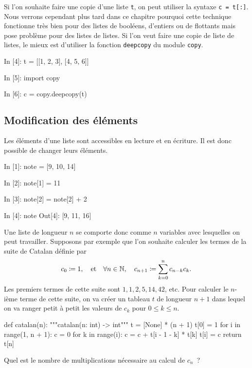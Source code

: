 \documentclass{magnoliaold}
\begin{document}
Si l'on souhaite faire une copie d'une liste \verb!t!, on peut
utiliser la syntaxe \verb!c = t[:]!. Nous verrons cependant plus tard
dans ce chapitre pourquoi cette technique fonctionne très bien pour
des listes de booléens, d'entiers ou de flottants mais pose problème
pour des listes de listes. Si l'on veut faire une copie de liste
de listes, le mieux est d'utiliser la
fonction \verb!deepcopy! du module \verb!copy!.

\begin{pythoncode}
In [4]: t = [[1, 2, 3], [4, 5, 6]]

In [5]: import copy

In [6]: c = copy.deepcopy(t)
\end{pythoncode}


\subsection{Modification des éléments}

Les éléments d'une liste sont accessibles en lecture et en écriture. Il est donc possible de changer leurs éléments.

\begin{pythoncode}
In [1]: note = [9, 10, 14]

In [2]: note[1] = 11

In [3]: note[2] = note[2] + 2

In [4]: note
Out[4]: [9, 11, 16]    
\end{pythoncode}
\noindent
Une liste de longueur $n$ se comporte donc comme $n$ variables avec lesquelles on peut
travailler. Supposons par exemple que l'on souhaite calculer les termes de la suite de Catalan
définie par
\[c_0\coloneqq 1,\quad \text{et}\quad \forall n\in\mathbb{N},\quad c_{n+1}\coloneqq\sum_{k=0}^n c_{n-k}c_k.\]
Les premiers termes de cette suite sont $1, 1, 2, 5, 14, 42$, etc. Pour calculer le $n$-ième
terme de cette suite, on va créer un tableau $t$ de longueur $n+1$ dans lequel on va ranger
petit à petit les valeurs de $c_k$ pour $0\leq k\leq n$.

\begin{pythoncode}
def catalan(n):
    """catalan(n: int) -> int"""
    t = [None] * (n + 1)
    t[0] = 1
    for i in range(1, n + 1):
        c = 0
        for k in range(i):
            c = c + t[i - 1 - k] * t[k]
        t[i] = c
    return t[n]
\end{pythoncode}

\begin{exoUnique}
\exo Quel est le nombre de multiplications nécessaire au calcul de $c_n$~?
\end{exoUnique}
\end{document}
